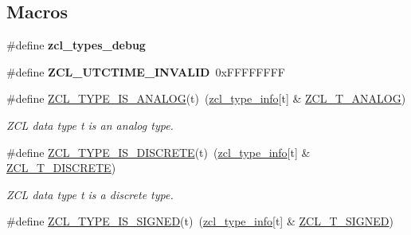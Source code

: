 \subsection*{Macros}
\begin{DoxyCompactItemize}
\item 
\hypertarget{group__zcl__types_ga6017ac37035b8b2b8a7fd864f8654c35}{\#define {\bfseries zcl\-\_\-types\-\_\-debug}}\label{group__zcl__types_ga6017ac37035b8b2b8a7fd864f8654c35}

\item 
\hypertarget{group__zcl__types_ga615c98b6baffcb91fa19285f2557845a}{\#define {\bfseries Z\-C\-L\-\_\-\-U\-T\-C\-T\-I\-M\-E\-\_\-\-I\-N\-V\-A\-L\-I\-D}~0x\-F\-F\-F\-F\-F\-F\-F\-F}\label{group__zcl__types_ga615c98b6baffcb91fa19285f2557845a}

\item 
\hypertarget{group__zcl__types_ga6e143abd16187cc59cdad352c1fde4bf}{\#define \hyperlink{group__zcl__types_ga6e143abd16187cc59cdad352c1fde4bf}{Z\-C\-L\-\_\-\-T\-Y\-P\-E\-\_\-\-I\-S\-\_\-\-A\-N\-A\-L\-O\-G}(t)~(\hyperlink{group__zcl__types_ga0f5737f60f1f37fb3b375e9fd5fe664d}{zcl\-\_\-type\-\_\-info}\mbox{[}t\mbox{]} \& \hyperlink{group__zcl__types_ga7b609984d4662f83a2248d1f485fd4ad}{Z\-C\-L\-\_\-\-T\-\_\-\-A\-N\-A\-L\-O\-G})}\label{group__zcl__types_ga6e143abd16187cc59cdad352c1fde4bf}

\begin{DoxyCompactList}\small\item\em Z\-C\-L data type {\itshape t} is an analog type. \end{DoxyCompactList}\item 
\hypertarget{group__zcl__types_gafac9417148b2a7a3fbd64d84baf98cf7}{\#define \hyperlink{group__zcl__types_gafac9417148b2a7a3fbd64d84baf98cf7}{Z\-C\-L\-\_\-\-T\-Y\-P\-E\-\_\-\-I\-S\-\_\-\-D\-I\-S\-C\-R\-E\-T\-E}(t)~(\hyperlink{group__zcl__types_ga0f5737f60f1f37fb3b375e9fd5fe664d}{zcl\-\_\-type\-\_\-info}\mbox{[}t\mbox{]} \& \hyperlink{group__zcl__types_ga3e9bf95af4f58a0c9c5c34639b0dda29}{Z\-C\-L\-\_\-\-T\-\_\-\-D\-I\-S\-C\-R\-E\-T\-E})}\label{group__zcl__types_gafac9417148b2a7a3fbd64d84baf98cf7}

\begin{DoxyCompactList}\small\item\em Z\-C\-L data type {\itshape t} is a discrete type. \end{DoxyCompactList}\item 
\hypertarget{group__zcl__types_ga9114be7b872a013b27e06e4aa437318f}{\#define \hyperlink{group__zcl__types_ga9114be7b872a013b27e06e4aa437318f}{Z\-C\-L\-\_\-\-T\-Y\-P\-E\-\_\-\-I\-S\-\_\-\-S\-I\-G\-N\-E\-D}(t)~(\hyperlink{group__zcl__types_ga0f5737f60f1f37fb3b375e9fd5fe664d}{zcl\-\_\-type\-\_\-info}\mbox{[}t\mbox{]} \& \hyperlink{group__zcl__types_gaacf8dcd439ce0388d90681aec545e4e3}{Z\-C\-L\-\_\-\-T\-\_\-\-S\-I\-G\-N\-E\-D})}\label{group__zcl__types_ga9114be7b872a013b27e06e4aa437318f}


\end{DoxyCompactItemize}
